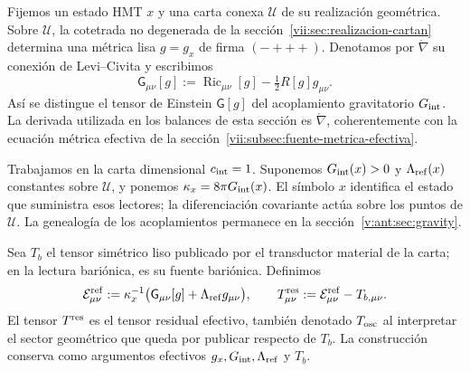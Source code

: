 Fijemos un estado HMT \(x\) y una carta conexa \(\mathcal U\) de su
realización geométrica. Sobre \(\mathcal U\), la cotetrada no degenerada
de la sección~\ref{vii:sec:realizacion-cartan} determina una métrica lisa
\(g=g_x\) de firma \((-+++)\). Denotamos por
\(\mathring\nabla\) su conexión de Levi--Civita y escribimos
\[
 \mathsf G_{\mu\nu}[g]
 :=\operatorname{Ric}_{\mu\nu}[g]-\tfrac12R[g]g_{\mu\nu}.
\]
Así se distingue el tensor de Einstein \(\mathsf G[g]\) del acoplamiento
gravitatorio \(G_{\rm int}\). La derivada utilizada en los balances
de esta sección es \(\mathring\nabla\), coherentemente con la ecuación
métrica efectiva de la sección~\ref{vii:subsec:fuente-metrica-efectiva}.

Trabajamos en la carta dimensional \(c_{\rm int}=1\). Suponemos
\(G_{\rm int}(x)>0\) y \(\Lambda_{\rm ref}(x)\) constantes sobre
\(\mathcal U\), y ponemos \(\kappa_x=8\pi G_{\rm int}(x)\).
El símbolo \(x\) identifica el estado que suministra esos lectores;
la diferenciación covariante actúa sobre los puntos de \(\mathcal U\).
La genealogía de los acoplamientos permanece en la
sección~\ref{v:ant:sec:gravity}.

Sea \(T_b\) el tensor simétrico liso publicado por el transductor material
de la carta; en la lectura bariónica, es su fuente bariónica. Definimos
\begin{equation}
 \mathcal E^{\rm ref}_{\mu\nu}
 :=\kappa_x^{-1}\bigl(\mathsf G_{\mu\nu}[g]
                            +\Lambda_{\rm ref}g_{\mu\nu}\bigr),
 \qquad
 T^{\rm res}_{\mu\nu}:=\mathcal E^{\rm ref}_{\mu\nu}-T_{b,\mu\nu}.
 \label{vii:eq:residual-definicion}
\end{equation}
El tensor \(T^{\rm res}\) es el tensor residual efectivo, también
denotado \(T_{\rm osc}\) al interpretar el sector geométrico que queda
por publicar respecto de \(T_b\). La construcción conserva como
argumentos efectivos \(g_x,G_{\rm int},\Lambda_{\rm ref}\) y \(T_b\).

